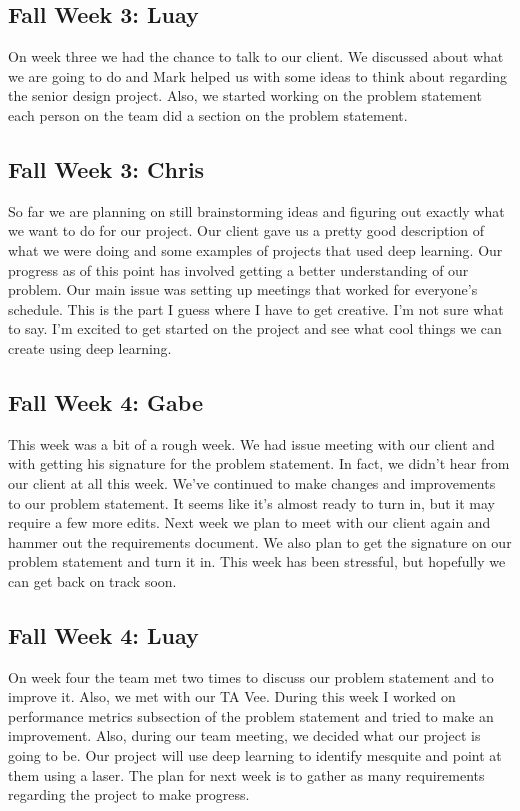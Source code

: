 \documentclass[onecolumn, draftclsnofoot,10pt, compsoc]{IEEEtran}
\begin{document}
\subsection{Fall Week 3: Luay}
On week three we had the chance to talk to our client. We discussed about what we are going to do and Mark helped us with some ideas to think about regarding the senior design project. Also, we started working on the problem statement each person on the team did a section on the problem statement.
\subsection{Fall Week 3: Chris}
So far we are planning on still brainstorming ideas and figuring out exactly what we want to do for our project. Our client gave us a pretty good description of what we were doing and some examples of projects that used deep learning. Our progress as of this point has involved getting a better understanding of our problem. Our main issue was setting up meetings that worked for everyone's schedule. This is the part I guess where I have to get creative. I'm not sure what to say. I'm excited to get started on the project and see what cool things we can create using deep learning.
\subsection{Fall Week 4: Gabe}
This week was a bit of a rough week. We had issue meeting with our client and with getting his signature for the problem statement. In fact, we didn't hear from our client at all this week. We've continued to make changes and improvements to our problem statement. It seems like it's almost ready to turn in, but it may require a few more edits. Next week we plan to meet with our client again and hammer out the requirements document. We also plan to get the signature on our problem statement and turn it in. This week has been stressful, but hopefully we can get back on track soon.
\subsection{Fall Week 4: Luay}
On week four the team met two times to discuss our problem statement and to improve it. Also, we met with our TA Vee. During this week I worked on performance metrics subsection of the problem statement and tried to make an improvement. Also, during our team meeting, we decided what our project is going to be. Our project will use deep learning to identify mesquite and point at them using a laser. The plan for next week is to gather as many requirements regarding the project to make progress.
\end{document}

